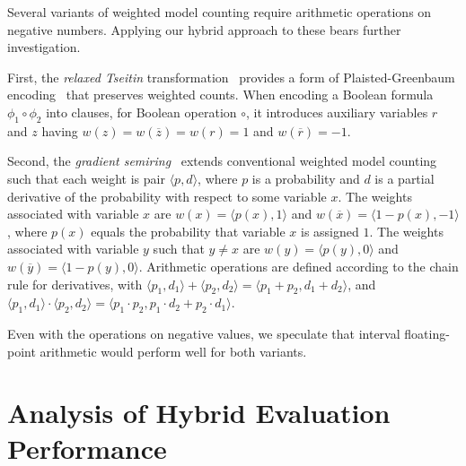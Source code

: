 \documentclass[letterpaper,USenglish,cleveref, autoref, thm-restate]{lipics-v2021}
\newcommand{\obar}[1]{\overline{#1}}
\begin{document}
Several variants of weighted model counting require
arithmetic operations on negative numbers.  Applying our hybrid approach to these bears further investigation.

First,
the \emph{relaxed Tseitin}
transformation~\cite{meert:starai:2016} provides  a form
of Plaisted-Green\-baum encoding~\cite{plaisted:jsc:1986} that preserves
weighted counts.  When encoding a Boolean formula $\phi_1 \circ \phi_2$ into clauses,
for Boolean operation $\circ$,
it introduces auxiliary variables $r$ and $z$ having
$w(z) = w(\obar{z}) = w(r) = 1$ and $w(\obar{r}) = -1$.

Second, the \emph{gradient
semiring}~\cite{eisner:acl:2002, kimmig:jal:2017,maene:aaai:2025} extends conventional weighted
model counting such that each weight is pair $\langle p, d \rangle$,
where $p$ is a probability and $d$ is a partial derivative of the
probability with respect to some variable $x$.  The weights
associated with variable $x$ are $w(x) = \langle p(x), 1\rangle$ and
$w(\obar{x}) = \langle 1-p(x), -1\rangle$, where $p(x)$ equals the probability that variable $x$ is assigned $1$.
The weights associated with variable $y$ such that $y \not = x$ are
$w(y) = \langle p(y), 0\rangle$ and
$w(\obar{y}) = \langle 1-p(y), 0\rangle$.  Arithmetic operations are defined according to the chain rule for derivatives,
with $\langle p_1, d_1\rangle + \langle p_2, d_2\rangle = \langle p_1 + p_2, d_1 + d_2\rangle$, and
$\langle p_1, d_1\rangle \cdot \langle p_2, d_2\rangle = \langle p_1 \cdot p_2, p_1 \cdot d_2 + p_2 \cdot d_1\rangle$.

Even with the operations on negative values, we speculate that interval floating-point arithmetic would perform well for both variants.


\newpage


\newpage
\appendix

\section{Analysis of Hybrid Evaluation Performance}
\label{app:performance}
\end{document}
